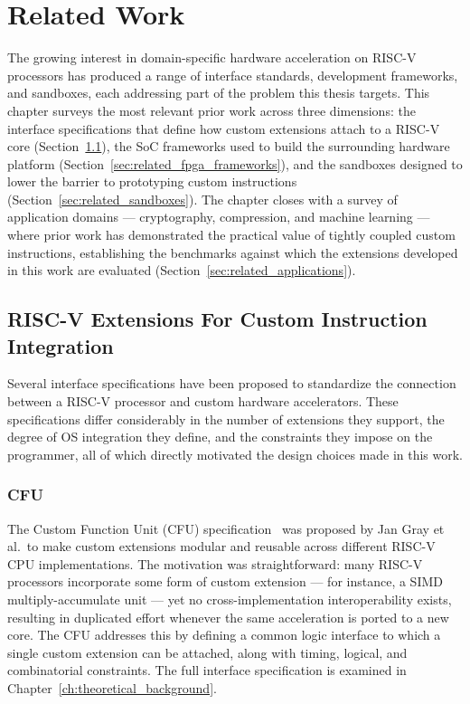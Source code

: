 \chapter{Related Work}
\label{ch:related_work}

The growing interest in domain-specific hardware acceleration on RISC-V processors
has produced a range of interface standards, development frameworks, and sandboxes,
each addressing part of the problem this thesis targets.
This chapter surveys the most relevant prior work across three dimensions: the
interface specifications that define how custom extensions attach to a RISC-V core
(Section~\ref{sec:related_riscv_extensions}), the SoC frameworks used to build
the surrounding hardware platform (Section~\ref{sec:related_fpga_frameworks}), and
the sandboxes designed to lower the barrier to prototyping custom instructions
(Section~\ref{sec:related_sandboxes}).
The chapter closes with a survey of application domains --- cryptography, compression,
and machine learning --- where prior work has demonstrated the practical value of
tightly coupled custom instructions, establishing the benchmarks against which
the extensions developed in this work are evaluated
(Section~\ref{sec:related_applications}).

\section{RISC-V Extensions For Custom Instruction Integration}
\label{sec:related_riscv_extensions}

Several interface specifications have been proposed to standardize the connection between
a RISC-V processor and custom hardware accelerators.
These specifications differ considerably in the number of extensions they support,
the degree of OS integration they define, and the constraints they impose on the
programmer, all of which directly motivated the design choices made in this work.

\subsection{CFU}
\label{subsec:cfu}

The Custom Function Unit (CFU) specification~\cite{Gray2022CFU, Gray2025CXU, Gray2025CXUGithub}
was proposed by Jan Gray et al.\ to make custom extensions modular and reusable
across different RISC-V CPU implementations.
The motivation was straightforward: many RISC-V processors incorporate some form of
custom extension --- for instance, a SIMD multiply-accumulate unit --- yet no
cross-implementation interoperability exists, resulting in duplicated effort whenever
the same acceleration is ported to a new core.
The CFU addresses this by defining a common logic interface to which a single custom
extension can be attached, along with timing, logical, and combinatorial constraints.
The full interface specification is examined in Chapter~\ref{ch:theoretical_background}.


